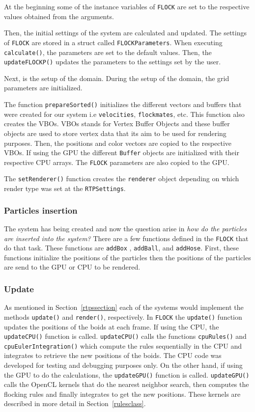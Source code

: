 At the beginning some of the instance variables of \texttt{FLOCK} are set to the respective values obtained from the arguments. 

Then, the initial settings of the system are calculated and updated. The settings of \texttt{FLOCK} are stored in a struct called \texttt{FLOCKParameters}. When executing \texttt{calculate()}, the parameters are set to the default values. Then, the \texttt{updateFLOCKP()} updates the parameters to the settings set by the user. 

Next, is the setup of the domain. During the setup of the domain, the grid parameters are initialized.

The function \texttt{prepareSorted()} initializes the different vectors and buffers that were created for our system i.e \texttt{velocities}, \texttt{flockmates}, etc. This function also creates the VBOs. VBOs stands for Vertex Buffer Objects and these buffer objects are used to store vertex data that its aim to be used for rendering purposes\cite{vbo}. Then, the positions and color vectors are copied to the respective VBOs. If using the GPU the different \texttt{Buffer} objects are initialized with their respective CPU arrays. The \texttt{FLOCK} parameters are also copied to the GPU. 

The \texttt{setRenderer()} function creates the \texttt{renderer} object depending on which render type was set at the \texttt{RTPSettings}.

\subsubsection{Particles insertion}
The system has being created and now the question arise in \textit{how do the particles are inserted into the system?} There are a few functions defined in the \texttt{FLOCK} that do that task. These functions are \texttt{addBox} , \texttt{addBall}, and \texttt{addHose}. First, these functions initialize the positions of the particles then the positions of the particles are send to the GPU or CPU to be rendered. 

\subsubsection{Update}
As mentioned in Section~\ref{rtpssection} each of the systems would implement the methods \texttt{update()} and \texttt{render()}, respectively. In \texttt{FLOCK} the \texttt{update()} function updates the positions of the boids at each frame. If using the CPU, the \texttt{updateCPU()} function is called. \texttt{updateCPU()} calls the functions \texttt{cpuRules()} and \texttt{cpuEulerIntegration()} which compute the rules sequentially in the CPU and integrates to retrieve the new positions of the boids. The CPU code was developed for testing and debugging purposes only. On the other hand, if using the GPU to do the calculations, the \texttt{updateGPU()} function is called. \texttt{updateGPU()} calls the OpenCL kernels that do the nearest neighbor search, then computes the flocking rules and finally integrates to get the new positions. These kernels are described in more detail in Section~\ref{rulesclass}.


